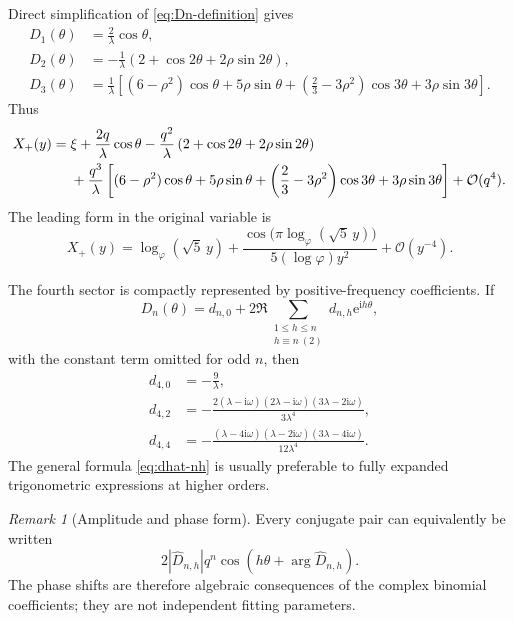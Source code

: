 \documentclass[11pt,oneside]{article}
\numberwithin{equation}{section}
\theoremstyle{plain}
\theoremstyle{definition}
\theoremstyle{remark}
\newtheorem{remark}[theorem]{Remark}
\newcommand{\e}{\mathrm e}
\newcommand{\ii}{\mathrm i}
\newcommand{\Ord}{\mathcal O}
\begin{document}
Direct simplification of \cref{eq:Dn-definition} gives
\begin{align}
 D_1(\theta)
 &=\frac2\lambda\cos\theta,
 \label{eq:D1}\\
 D_2(\theta)
 &=-\frac1\lambda
   \left(2+\cos2\theta+2\rho\sin2\theta\right),
 \label{eq:D2}\\
 D_3(\theta)
 &=\frac1\lambda\left[
   (6-\rho^2)\cos\theta+5\rho\sin\theta
   +\left(\frac23-3\rho^2\right)\cos3\theta
   +3\rho\sin3\theta
 \right].
 \label{eq:D3}
\end{align}
Thus
\begin{align}
 X_+(y)={}&\xi+\frac{2q}{\lambda}\cos\theta
 -\frac{q^2}{\lambda}
   \left(2+\cos2\theta+2\rho\sin2\theta\right)
 \notag\\
 &+\frac{q^3}{\lambda}\left[
   (6-\rho^2)\cos\theta+5\rho\sin\theta
   +\left(\frac23-3\rho^2\right)\cos3\theta
   +3\rho\sin3\theta
 \right]
 +\Ord(q^4).
 \label{eq:first-three-sectors}
\end{align}
The leading form in the original variable is
\begin{equation}\label{eq:leading-y}
 X_+(y)=\log_{\varphi}(\sqrt5\,y)
 +\frac{\cos\!\bigl(\pi\log_{\varphi}(\sqrt5\,y)\bigr)}
 {5(\log\varphi)y^2}
 +\Ord(y^{-4}).
\end{equation}

The fourth sector is compactly represented by positive-frequency
coefficients.  If
\begin{equation}\label{eq:D-positive-frequency}
 D_n(\theta)=d_{n,0}+
 2\Re\sum_{\substack{1\le h\le n\\h\equiv n\ (2)}}
 d_{n,h}\e^{\ii h\theta},
\end{equation}
with the constant term omitted for odd \(n\), then
\begin{align}
 d_{4,0}&=-\frac9\lambda,\label{eq:d40}\\
 d_{4,2}&=-\frac{2(\lambda-\ii\omega)(2\lambda-\ii\omega)
                    (3\lambda-2\ii\omega)}{3\lambda^4},
 \label{eq:d42}\\
 d_{4,4}&=-\frac{(\lambda-4\ii\omega)(\lambda-2\ii\omega)
                    (3\lambda-4\ii\omega)}{12\lambda^4}.
 \label{eq:d44}
\end{align}
The general formula \cref{eq:dhat-nh} is usually preferable to fully
expanded trigonometric expressions at higher orders.

\begin{remark}[Amplitude and phase form]
Every conjugate pair can equivalently be written
\[
 2|\widehat D_{n,h}|q^n
 \cos\!\left(h\theta+\arg\widehat D_{n,h}\right).
\]
The phase shifts are therefore algebraic consequences of the complex
binomial coefficients; they are not independent fitting parameters.
\end{remark}
\end{document}
